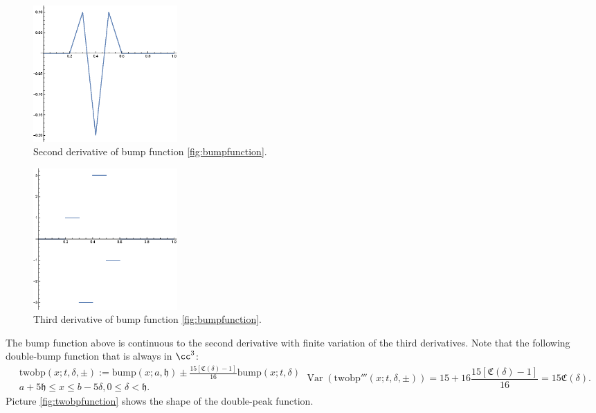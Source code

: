 \documentclass{iitthesis}
\DeclareMathOperator{\Var}{Var}
\theoremstyle{definition}
\theoremstyle{remark}
\begin{document}
\begin{figure}[ht]
\centering
\includegraphics[width=5.5cm]{bumpp2.eps}
\caption{Second derivative of bump function \ref{fig:bumpfunction}. \label{fig:bumpp2}}
\end{figure}
\begin{figure}[ht]
\centering
\includegraphics[width=5.5cm]{bumpp3.eps}
\caption{Third derivative of bump function \ref{fig:bumpfunction}. \label{fig:bumpp3}}
\end{figure}
The bump function above is continuous to the second derivative with finite variation of the third derivatives. Note that the following double-bump function that is always in $\cc^3$:
\begin{subequations}
    \begin{multline}\label{foolingfunctionsim}
        \text{twobp}(x;t,\delta,\pm):=\text{bump}(x;a,\mathfrak{h})\pm\frac{15[\mathfrak{C}(\delta)-1]}{16}\text{bump}(x;t,\delta)\\ a+5\mathfrak{h}\le x \le b-5\delta, 0\le \delta <\mathfrak{h}.
    \end{multline}
    \begin{equation}
        \Var(\text{twobp}'''(x;t,\delta,\pm))=15+16\frac{15[\mathfrak{C}(\delta)-1]}{16}=15\mathfrak{C}(\delta).
    \end{equation}
\end{subequations}
Picture \ref{fig:twobpfunction} shows the shape of the double-peak function.
\end{document}
